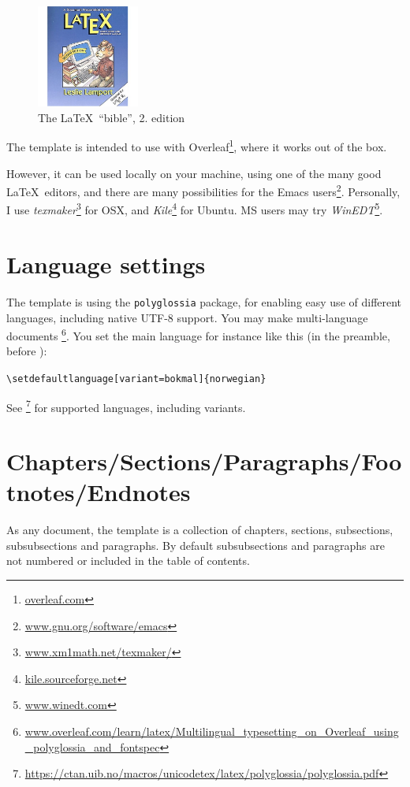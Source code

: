 \begin{figure}[!htbp]
\centering 
    \includegraphics[width=0.3\textwidth]{Graphics/lamport}
    \caption{The \LaTeX\ ``bible'', 2. edition \label{fig:lamport}}
\end{figure}


The template is intended to use with Overleaf\footnote{\url{overleaf.com}}, where it works out of the box.

However, it can be used locally on your machine, using one of the many good \LaTeX\ editors, and there are many possibilities for the Emacs users\footnote{\url{www.gnu.org/software/emacs}}. Personally, I use {\em texmaker}\footnote{\url{www.xm1math.net/texmaker/}}
for OSX, and 
{\em Kile}\footnote{\url{kile.sourceforge.net}}
for Ubuntu. MS users may try {\em WinEDT}\footnote{\url{www.winedt.com}}.


\section{Language settings}

The template is using the \texttt{polyglossia} package, for enabling easy use of different languages, including native UTF-8 support. You may make multi-language documents \footnote{\url{www.overleaf.com/learn/latex/Multilingual_typesetting_on_Overleaf_using_polyglossia_and_fontspec}}. You set the main language for instance like this (in the preamble, before \verb||):

\verb|\setdefaultlanguage[variant=bokmal]{norwegian}|

See \parencite[p.~6]{polyglossia}\footnote{\url{https://ctan.uib.no/macros/unicodetex/latex/polyglossia/polyglossia.pdf}} for supported languages, including variants.

\section{Chapters/Sections/Paragraphs/Footnotes/Endnotes}

As any document, the template is a collection of chapters, sections, subsections, subsubsections and paragraphs. By default subsubsections and paragraphs are not numbered or included in the table of contents. 

